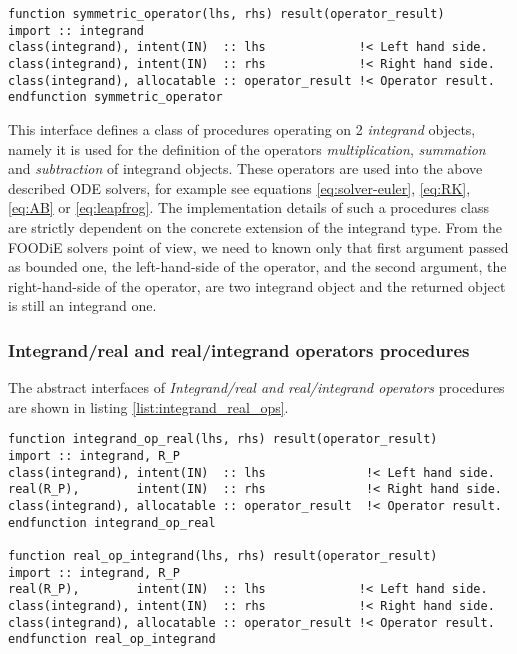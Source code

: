 \begin{lstlisting}[firstnumber=1,style=code,caption={symmetric operator procedure interface},label={list:symmetric_operator}]
function symmetric_operator(lhs, rhs) result(operator_result)
import :: integrand
class(integrand), intent(IN)  :: lhs             !< Left hand side.
class(integrand), intent(IN)  :: rhs             !< Right hand side.
class(integrand), allocatable :: operator_result !< Operator result.
endfunction symmetric_operator
\end{lstlisting}

This interface defines a class of procedures operating on 2 \emph{integrand} objects, namely it is used for the definition of the operators \emph{multiplication}, \emph{summation} and \emph{subtraction} of integrand objects. These operators are used into the above described ODE solvers, for example see equations \ref{eq:solver-euler}, \ref{eq:RK}, \ref{eq:AB} or \ref{eq:leapfrog}. The implementation details of such a procedures class are strictly dependent on the concrete extension of the integrand type. From the FOODiE solvers point of view, we need to known only that first argument passed as bounded one, the left-hand-side of the operator, and the second argument, the right-hand-side of the operator, are two integrand object and the returned object is still an integrand one.

\subsubsection{Integrand/real and real/integrand operators procedures}

The abstract interfaces of \emph{Integrand/real and real/integrand operators} procedures are shown in listing \ref{list:integrand_real_ops}.

\begin{lstlisting}[firstnumber=1,style=code,caption={Integrand/real and real/integrand operators procedure interfaces},label={list:integrand_real_ops}]
function integrand_op_real(lhs, rhs) result(operator_result)
import :: integrand, R_P
class(integrand), intent(IN)  :: lhs              !< Left hand side.
real(R_P),        intent(IN)  :: rhs              !< Right hand side.
class(integrand), allocatable :: operator_result  !< Operator result.
endfunction integrand_op_real

function real_op_integrand(lhs, rhs) result(operator_result)
import :: integrand, R_P
real(R_P),        intent(IN)  :: lhs             !< Left hand side.
class(integrand), intent(IN)  :: rhs             !< Right hand side.
class(integrand), allocatable :: operator_result !< Operator result.
endfunction real_op_integrand
\end{lstlisting}


